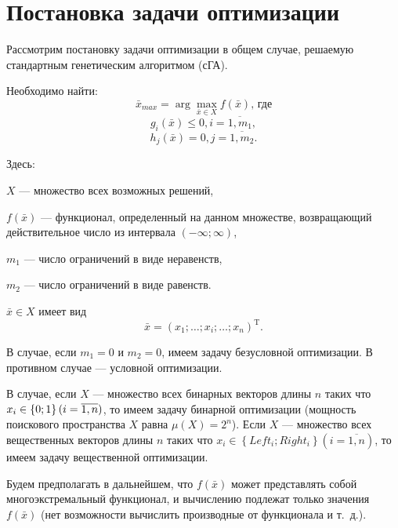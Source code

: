 \chapter{Постановка задачи оптимизации}\label{StandardGA:section_problemoptimization}

Рассмотрим постановку задачи оптимизации в общем случае, решаемую стандартным генетическим алгоритмом (сГА).

Необходимо найти:
\begin{equation}
\label{StandardGA:eq:problemoptimization}
\bar{x}_{max} = \arg{ \max_{\bar{x} \in X}{f\left ( \bar{x} \right )} }\text {, где}
\end{equation}
\begin{equation*}
g_i\left (\bar{x}\right )\leq 0, i=\overline{1,m_1},
\end{equation*}
\begin{equation*}
h_j\left (\bar{x}\right )= 0, j=\overline{1,m_2}.
\end{equation*}

Здесь:

$ X $ --- множество всех возможных решений,

$ f\left ( \bar{x} \right ) $ --- функционал, определенный на данном множестве, возвращающий действительное число из интервала $ (-\infty;\infty) $,

$ m_1 $ --- число ограничений в виде неравенств,

$ m_2 $ --- число ограничений в виде равенств.

$ \bar{x} \in X $ имеет вид 
\begin{equation}
\label{StandardGA:eq:formofvector}
\bar{x}={\left(x_1;\dots;x_i;\dots;x_n \right)}^\mathrm{T}.
\end{equation}

В случае, если $ m_1=0 $ и $ m_2=0 $, имеем задачу безусловной оптимизации. В противном случае --- условной оптимизации.

В случае, если $ X $ --- множество всех бинарных векторов длины $ n $ таких что $ x_i\in\left\lbrace 0;1\right\rbrace  (i\hmm=\overline{1,n})$, то имеем задачу бинарной оптимизации (мощность поискового пространства $ X $ равна $ \mu(X)=2^n $). Если $ X $ --- множество всех вещественных векторов длины $ n $ таких что $ x_i\in\left\lbrace Left_i;Right_i\right\rbrace (i=\overline{1,n}) $, то имеем задачу вещественной оптимизации.

Будем предполагать в дальнейшем, что $ f(\bar{x}) $ может представлять собой  многоэкстремальный функционал, и вычислению подлежат только значения $ f(\bar{x}) $ (нет возможности вычислить производные от функционала и т.~д.).

